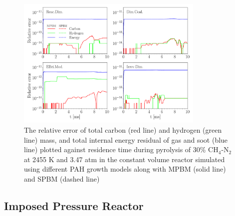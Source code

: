 \begin{figure}[H]
	\centering
	\includegraphics[width=0.8\textwidth]{Figures/Results/Validation/ConstUV/relerr_constuv.pdf}
	\caption{The relative error of total carbon (red line) and hydrogen (green line) mass, and total internal energy residual of gas and soot (blue line) plotted against residence time during pyrolysis of 30\% $\mathrm{CH_4}$-$\mathrm{N_2}$ at 2455 K and 3.47 atm in the constant volume reactor simulated using different PAH growth models along with MPBM (solid line) and SPBM (dashed line)}
	\label{fig:constuvvalid}
\end{figure}

\subsection{Imposed Pressure Reactor}

